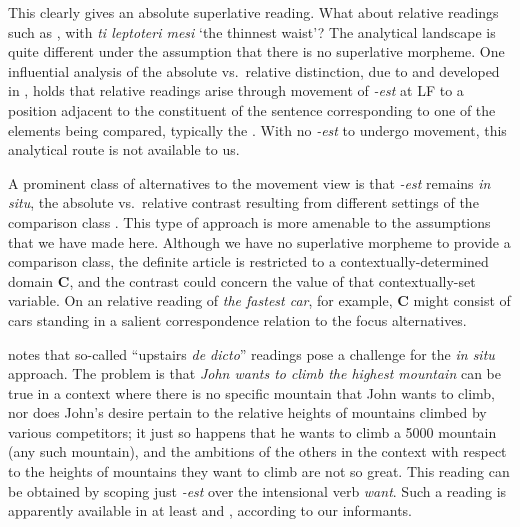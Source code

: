 \documentclass[output=paper
,modfonts
,nonflat]{langsci/langscibook}
\begin{document}
This clearly gives an absolute superlative reading. What about relative readings such as , with \textit{ti leptoteri mesi}  `the thinnest waist'? The analytical landscape is quite different under the assumption that there is no superlative morpheme. One influential analysis of the absolute vs.\ relative distinction, due to \citet{Szabolcsi1986} and developed in \citet{Heim1999}, holds that relative readings arise through movement of \textit{-est} at LF to a position adjacent to the constituent of the sentence corresponding to one of the elements being compared, typically the . With no \textit{-est} to undergo movement, this analytical route is not available to us. 

A prominent class of alternatives to the movement view is that \textit{-est} remains \textit{in situ}, the absolute vs.\ relative contrast resulting from different settings of the comparison class \citep{Gawron1995,FarkasKiss2000,SharvitStateva2002,Gutierrez-Rexach2006,Teodorescu2009,PanchevaTomaszewicz2012,CoppockBeaver2014,CoppockJosefson2015}.  This type of approach is more amenable to the assumptions that we have made here. Although we have no superlative morpheme to provide a comparison class, the definite article is restricted to a contextually-determined domain $\textbf{C}$, and the contrast could concern the value of that contextually-set variable. On an relative reading of \textit{the fastest car}, for example,  $\textbf{C}$ might consist of cars standing in a salient correspondence relation to the focus alternatives.

\citet{Heim1999} notes that so-called ``upstairs \textit{de dicto}'' readings pose a challenge for the \textit{in situ} approach. The problem is that \textit{John wants to climb the highest mountain} can be true in a context where there is no specific mountain that John wants to climb, nor does John's desire pertain to the relative heights of mountains climbed by various competitors; it just so happens that he wants to climb a 5000 mountain (any such mountain), and the ambitions of the others in the context with respect to the heights of mountains they want to climb are not so great. This reading can be obtained by scoping just \textit{-est} over the intensional verb \textit{want}. Such a reading is apparently available in at least  and , according to our informants.
\end{document}
